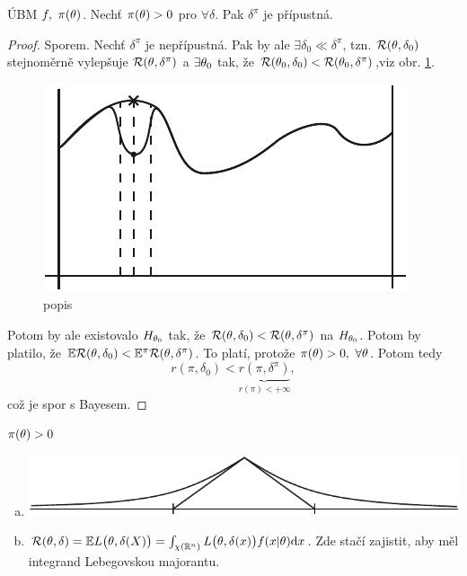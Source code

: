 \begin{theorem}
	ÚBM $f,~\pi(\theta)$. Nechť $\pi(\theta)>0$ pro $\forall\delta$. Pak $\delta^\pi$ je přípustná.
	\begin{proof}
		Sporem. Nechť $\delta^\pi$ je nepřípustná. Pak by ale $\exists\delta_0\ll\delta^\pi$, tzn. $\mathcal{R}(\theta,\delta_0)$ stejnoměrně vylepšuje $\mathcal{R}(\theta,\delta^\pi)$ a $\exists\theta_0$ tak, že $\mathcal{R}(\theta_0,\delta_0)<\mathcal{R}(\theta_0,\delta^\pi)$,viz obr. \ref{fig:26}.
		\begin{figure}[h]
			\centering
			\includegraphics[width=0.35\linewidth]{pictures/26_11.pdf}
			\caption{popis}
			\label{fig:26}
		\end{figure}
		Potom by ale existovalo $H_{\theta_0}$ tak, že $\mathcal{R}(\theta,\delta_0)<\mathcal{R}(\theta,\delta^\pi)$ na $H_{\theta_0}$. Potom by platilo, že $\mathbb{E} \mathcal{R}(\theta,\delta_0)<\mathbb{E}^\pi \mathcal{R}(\theta,\delta^\pi)$. To platí, protože $\pi(\theta)>0,~\forall\theta$. Potom tedy 
		$$ r(\pi,\delta_0)<\underbrace{r(\pi,\delta^\pi)}_{r(\pi)<+\infty},$$ což je spor s Bayesem.
	\end{proof} 
\end{theorem}
\begin{remark}
	$\pi(\theta)>0$
\begin{enumerate}[a)]
	\item 	\begin{center}
			\includegraphics[width=0.7\linewidth]{pictures/26_11_2.pdf}
	\end{center}
\item $\mathcal{R}(\theta,\delta)=\mathbb{E} L\big(\theta,\delta(X)\big)=\int_{\chi(\mathbb{R}^n)}L\big(\theta,\delta(x)\big)f(x|\theta)\mathrm{d} x$. Zde stačí zajistit, aby měl integrand Lebegovskou majorantu.
\end{enumerate}

\end{remark}
